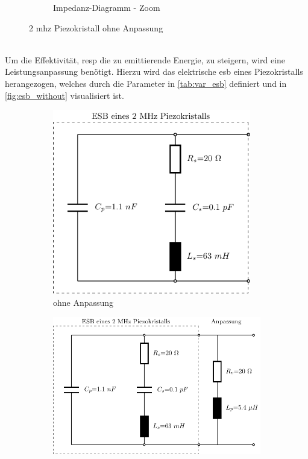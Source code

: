 \begin{figure}[h!]
\begin{subfigure}[t]{0.48\textwidth}
	    		\caption{Impedanz-Diagramm - Zoom}
	    		\label{fig:imp_2mhz_with}
        \end{subfigure}
	\caption{2 \acs{mhz} Piezokristall ohne Anpassung}
	\label{fig:imp_2mhz_without}
\end{figure}\\
Um die Effektivität, \ac{resp} die zu emittierende Energie, zu steigern, wird eine Leistungsanpassung benötigt. Hierzu wird das elektrische \ac{esb} eines Piezokristalls herangezogen, welches durch die Parameter in \autoref{tab:var_esb} definiert und in \autoref{fig:esb_without} visualisiert ist.
\begin{figure}[h!]
	\centering
	\begin{subfigure}[b]{0.42\textwidth}
		\centering
  		\includegraphics[width=0.95\textwidth]{images/Ultrasound/ESB}
  		\caption{ohne Anpassung}
  		\label{fig:esb_without}
  	\end{subfigure}
  	\hfill
  	\begin{subfigure}[b]{0.56\textwidth}
	  	\centering
		\includegraphics[width=1\textwidth]{images/Ultrasound/ESB_with_inductance}

\end{subfigure}
\end{figure}
